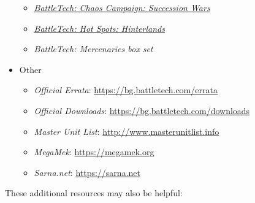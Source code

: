 \begin{itemize}
\begin{itemize}
    \item \emph{\href{https://store.catalystgamelabs.com/products/battletech-chaos-campaign-succession-wars}{BattleTech: Chaos Campaign: Succession Wars}}

    \item \emph{\href{https://store.catalystgamelabs.com/products/battletech-hot-spots-hinterlands}{BattleTech: Hot Spots: Hinterlands}}

    \item \emph{BattleTech: Mercenaries box set}

  \end{itemize}

  \item Other

  \begin{itemize}

    \item \emph{Official Errata}: \href{https://bg.battletech.com/errata}{https://bg.battletech.com/errata}

    \item \emph{Official Downloads}: \href{https://bg.battletech.com/downloads}{https://bg.battletech.com/downloads}

    \item \emph{Master Unit List}: \href{http://www.masterunitlist.info}{http://www.masterunitlist.info}

    \item \emph{MegaMek}: \href{https://megamek.org}{https://megamek.org}

    \item \emph{Sarna.net}: \href{https://sarna.net}{https://sarna.net}

  \end{itemize}

\end{itemize}

These additional resources may also be helpful:

